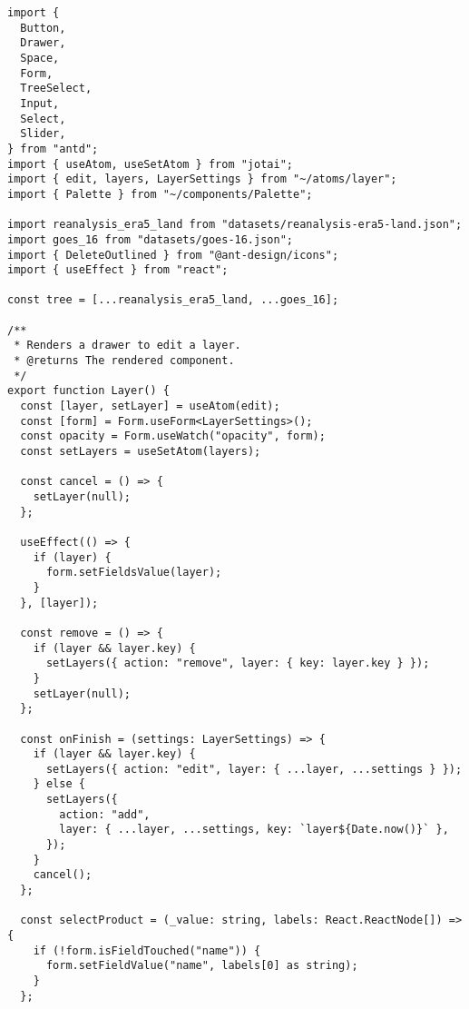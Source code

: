 \begin{verbatim}
import {
  Button,
  Drawer,
  Space,
  Form,
  TreeSelect,
  Input,
  Select,
  Slider,
} from "antd";
import { useAtom, useSetAtom } from "jotai";
import { edit, layers, LayerSettings } from "~/atoms/layer";
import { Palette } from "~/components/Palette";

import reanalysis_era5_land from "datasets/reanalysis-era5-land.json";
import goes_16 from "datasets/goes-16.json";
import { DeleteOutlined } from "@ant-design/icons";
import { useEffect } from "react";

const tree = [...reanalysis_era5_land, ...goes_16];

/**
 * Renders a drawer to edit a layer.
 * @returns The rendered component.
 */
export function Layer() {
  const [layer, setLayer] = useAtom(edit);
  const [form] = Form.useForm<LayerSettings>();
  const opacity = Form.useWatch("opacity", form);
  const setLayers = useSetAtom(layers);

  const cancel = () => {
    setLayer(null);
  };

  useEffect(() => {
    if (layer) {
      form.setFieldsValue(layer);
    }
  }, [layer]);

  const remove = () => {
    if (layer && layer.key) {
      setLayers({ action: "remove", layer: { key: layer.key } });
    }
    setLayer(null);
  };

  const onFinish = (settings: LayerSettings) => {
    if (layer && layer.key) {
      setLayers({ action: "edit", layer: { ...layer, ...settings } });
    } else {
      setLayers({
        action: "add",
        layer: { ...layer, ...settings, key: `layer${Date.now()}` },
      });
    }
    cancel();
  };

  const selectProduct = (_value: string, labels: React.ReactNode[]) => {
    if (!form.isFieldTouched("name")) {
      form.setFieldValue("name", labels[0] as string);
    }
  };


\end{verbatim}
